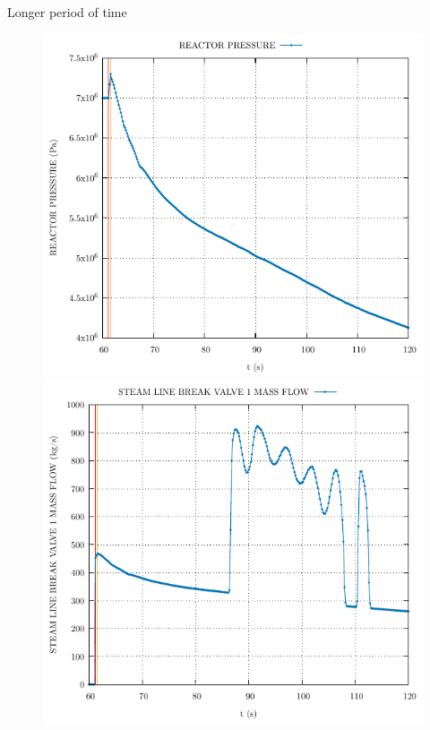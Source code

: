 \begin{frame}{Longer period of time}
	\begin{figure}
		\centering
		\begin{minipage}{.5\textwidth}
			\centering
			\includegraphics[width=0.7\linewidth]{./graphs/REACTOR PRESSURE.pdf}
		\end{minipage}%
		\begin{minipage}{.5\textwidth}
			\centering
			\includegraphics[width=.7\linewidth]{./graphs/STEAM LINE BREAK VALVE 1 MASS FLOW.pdf}
		\end{minipage}
	\end{figure}
	\vspace{-10pt}
	\begin{figure}
		\centering
		\begin{minipage}{.5\textwidth}
			\centering

\end{minipage}
\end{figure}
\end{frame}
